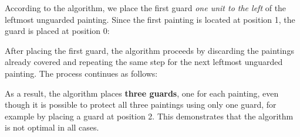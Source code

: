 \documentclass[12pt]{article}
\begin{document}
According to the algorithm, we place the first guard \textit{one unit to the left} of the leftmost unguarded painting. Since the first painting is located at position 1, the guard is placed at position 0:

\begin{center}
\end{center}

After placing the first guard, the algorithm proceeds by discarding the paintings already covered and repeating the same step for the next leftmost unguarded painting. The process continues as follows:

\begin{center}
\end{center}
As a result, the algorithm places \textbf{three guards}, one for each painting, even though it is possible to protect all three paintings using only one guard, for example by placing a guard at position 2. This demonstrates that the algorithm is not optimal in all cases.
\end{document}
